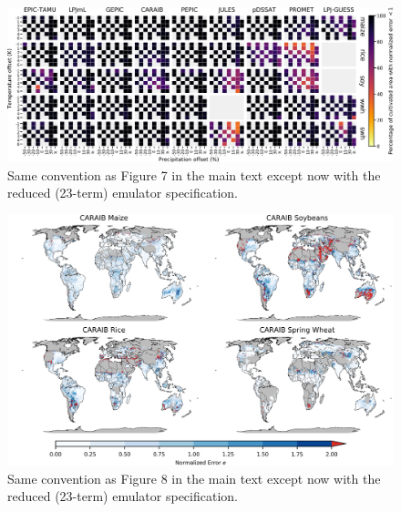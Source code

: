 \documentclass[10pt]{article}
\begin{document}
\begin{figure}[h!]
\centering
\includegraphics[width=15.5cm]{reduced_error_grid.png}
\caption{Same convention as Figure 7 in the main text except now with the reduced (23-term) emulator specification.}
\label{fig:reducedgrid}
\end{figure}

\begin{figure}[h!]
\centering
\includegraphics[width=15.5cm]{reduced_CARAIB_spatial_error.png}
\caption{Same convention as Figure 8 in the main text except now with the reduced (23-term) emulator specification.}
\label{fig:reducedcaraib}
\end{figure}
\end{document}
